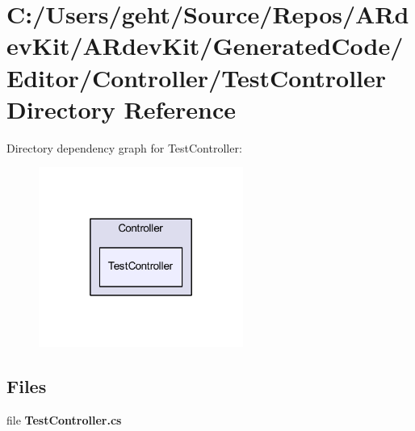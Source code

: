 \section{C\-:/\-Users/geht/\-Source/\-Repos/\-A\-Rdev\-Kit/\-A\-Rdev\-Kit/\-Generated\-Code/\-Editor/\-Controller/\-Test\-Controller Directory Reference}
\label{dir_c8ae7134df5f136e9b4d82772e865397}
Directory dependency graph for Test\-Controller\-:
\nopagebreak
\begin{figure}[H]
\begin{center}
\leavevmode
\includegraphics[width=190pt]{dir_c8ae7134df5f136e9b4d82772e865397_dep}
\end{center}
\end{figure}
\subsection*{Files}
\begin{DoxyCompactItemize}
\item 
file {\bfseries Test\-Controller.\-cs}
\end{DoxyCompactItemize}
